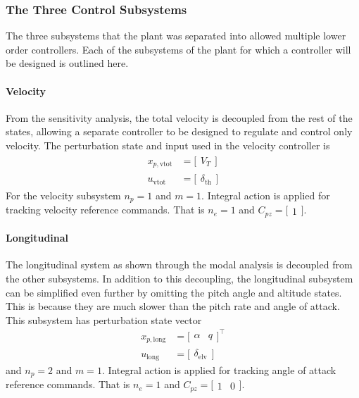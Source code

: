 \subsubsection*{The Three Control Subsystems}

The three subsystems that the plant was separated into allowed multiple lower order controllers.
Each of the subsystems of the plant for which a controller will be designed is outlined here.

\paragraph{Velocity}
From the sensitivity analysis, the total velocity is decoupled from the rest of the states, allowing a separate controller to be designed to regulate and control only velocity.
The perturbation state and input used in the velocity controller is
\begin{equation}
  \begin{split}
    x_{p,\text{vtot}}&=
    \bigr[
    \begin{array}{c}
      V_{T}
    \end{array}\bigr] \\
    u_{\text{vtot}}&=
    \bigr[
    \begin{array}{c}
      \delta_{\text{th}}
    \end{array}\bigr]
  \end{split}
\end{equation}
For the velocity subsystem $n_{p}=1$ and $m=1$.
Integral action is applied for tracking velocity reference commands.
That is $n_{e}=1$ and $C_{pz}=\bigr[\begin{array}{c}1\end{array}\bigr]$.

\paragraph{Longitudinal}
The longitudinal system as shown through the modal analysis is decoupled from the other subsystems.
In addition to this decoupling, the longitudinal subsystem can be simplified even further by omitting the pitch angle and altitude states.
This is because they are much slower than the pitch rate and angle of attack.
This subsystem has perturbation state vector
\begin{equation}
  \label{long_statevector_eqn}
  \begin{split}
    x_{p,\text{long}}&=
    \bigr[
    \begin{array}{cc}
      \alpha & q
    \end{array}\bigr]^{\top} \\
    u_{\text{long}}&=
    \bigr[
    \begin{array}{c}
      \delta_{\text{elv}}
    \end{array}\bigr]
  \end{split}
\end{equation}
and $n_{p}=2$ and $m=1$.
Integral action is applied for tracking angle of attack reference commands.
That is $n_{e}=1$ and $C_{pz}=\bigr[\begin{array}{cc}1 & 0 \end{array}\bigr]$.

